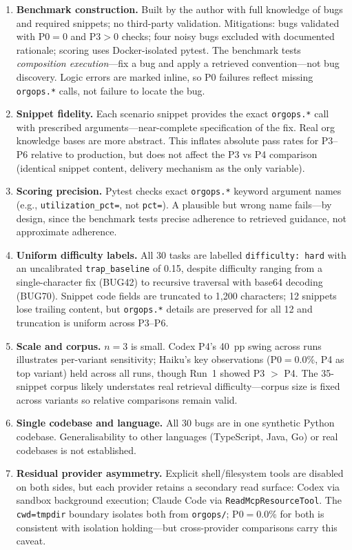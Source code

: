 \documentclass[10pt,a4paper,twocolumn]{article}
\begin{document}
\begin{enumerate}
    \item \textbf{Benchmark construction.} Built by the author with full knowledge of bugs and required snippets; no third-party validation. Mitigations: bugs validated with P0$=$0 and P3$>$0 checks; four noisy bugs excluded with documented rationale; scoring uses Docker-isolated pytest. The benchmark tests \emph{composition execution}---fix a bug and apply a retrieved convention---not bug discovery. Logic errors are marked inline, so P0 failures reflect missing \texttt{orgops.*} calls, not failure to locate the bug.

    \item \textbf{Snippet fidelity.} Each scenario snippet provides the exact \texttt{orgops.*} call with prescribed arguments---near-complete specification of the fix. Real org knowledge bases are more abstract. This inflates absolute pass rates for P3--P6 relative to production, but does not affect the P3 vs P4 comparison (identical snippet content, delivery mechanism as the only variable).

    \item \textbf{Scoring precision.} Pytest checks exact \texttt{orgops.*} keyword argument names (e.g., \texttt{utilization\_pct=}, not \texttt{pct=}). A plausible but wrong name fails---by design, since the benchmark tests precise adherence to retrieved guidance, not approximate adherence.

    \item \textbf{Uniform difficulty labels.} All 30 tasks are labelled \texttt{difficulty: hard} with an uncalibrated \texttt{trap\_baseline} of 0.15, despite difficulty ranging from a single-character fix (BUG42) to recursive traversal with base64 decoding (BUG70). Snippet code fields are truncated to 1,200 characters; 12 snippets lose trailing content, but \texttt{orgops.*} details are preserved for all 12 and truncation is uniform across P3--P6.

    \item \textbf{Scale and corpus.} $n{=}3$ is small. Codex P4's 40~pp swing across runs illustrates per-variant sensitivity; Haiku's key observations (P0$=$0.0\%, P4 as top variant) held across all runs, though Run~1 showed P3 $>$ P4. The 35-snippet corpus likely understates real retrieval difficulty---corpus size is fixed across variants so relative comparisons remain valid.

    \item \textbf{Single codebase and language.} All 30 bugs are in one synthetic Python codebase. Generalisability to other languages (TypeScript, Java, Go) or real codebases is not established.

    \item \textbf{Residual provider asymmetry.}
    \label{sec:lim-asymmetry}
    Explicit shell/filesystem tools are disabled on both sides, but each provider retains a secondary read surface: Codex via sandbox background execution; Claude Code via \texttt{ReadMcpResourceTool}. The \texttt{cwd=tmpdir} boundary isolates both from \texttt{orgops/}; P0$=$0.0\% for both is consistent with isolation holding---but cross-provider comparisons carry this caveat.
\end{enumerate}
\end{document}
